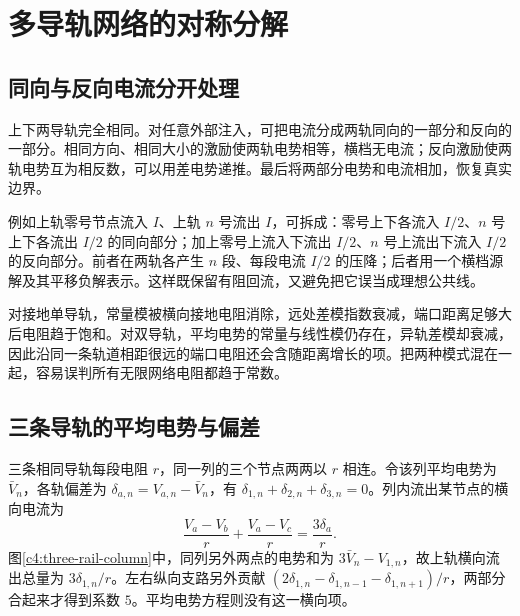 \section{多导轨网络的对称分解}
\subsection{同向与反向电流分开处理}

上下两导轨完全相同。对任意外部注入，可把电流分成两轨同向的一部分和反向的一部分。相同方向、相同大小的激励使两轨电势相等，横档无电流；反向激励使两轨电势互为相反数，可以用差电势递推。最后将两部分电势和电流相加，恢复真实边界。

例如上轨零号节点流入 $I$、上轨 $n$ 号流出 $I$，可拆成：零号上下各流入 $I/2$、$n$ 号上下各流出 $I/2$ 的同向部分；加上零号上流入下流出 $I/2$、$n$ 号上流出下流入 $I/2$ 的反向部分。前者在两轨各产生 $n$ 段、每段电流 $I/2$ 的压降；后者用一个横档源解及其平移负解表示。这样既保留有阻回流，又避免把它误当成理想公共线。

对接地单导轨，常量模被横向接地电阻消除，远处差模指数衰减，端口距离足够大后电阻趋于饱和。对双导轨，平均电势的常量与线性模仍存在，异轨差模却衰减，因此沿同一条轨道相距很远的端口电阻还会含随距离增长的项。把两种模式混在一起，容易误判所有无限网络电阻都趋于常数。

\subsection{三条导轨的平均电势与偏差}

三条相同导轨每段电阻 $r$，同一列的三个节点两两以 $r$ 相连。令该列平均电势为 $\bar V_n$，各轨偏差为 $\delta_{a,n}=V_{a,n}-\bar V_n$，有 $\delta_{1,n}+\delta_{2,n}+\delta_{3,n}=0$。列内流出某节点的横向电流为
\[
 \frac{V_a-V_b}r+\frac{V_a-V_c}r=\frac{3\delta_a}{r}.
\]
图\ref{c4:three-rail-column}中，同列另外两点的电势和为 $3\bar V_n-V_{1,n}$，故上轨横向流出总量为 $3\delta_{1,n}/r$。左右纵向支路另外贡献 $(2\delta_{1,n}-\delta_{1,n-1}-\delta_{1,n+1})/r$，两部分合起来才得到系数 $5$。平均电势方程则没有这一横向项。


